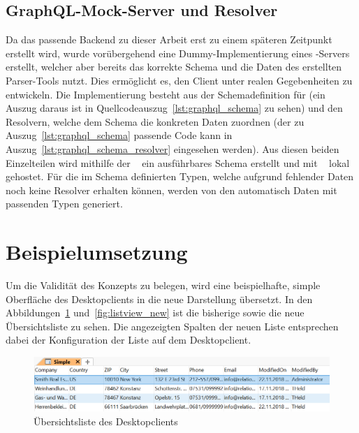 \subsection{GraphQL-Mock-Server und Resolver}
Da das passende Backend zu dieser Arbeit erst zu einem späteren Zeitpunkt erstellt wird, wurde vorübergehend eine Dummy-Implementierung eines -Servers erstellt, welcher aber bereits das korrekte Schema und die Daten des erstellten Parser-Tools nutzt. Dies ermöglicht es, den Client unter realen Gegebenheiten zu entwickeln. Die Implementierung besteht aus der Schemadefinition für  (ein Auszug daraus ist in Quellcodeauszug~\ref{lst:graphql_schema} zu sehen) und den Resolvern, welche dem Schema die konkreten Daten zuordnen (der zu Auszug~\ref{lst:graphql_schema} passende Code kann in Auszug~\ref{lst:graphql_schema_resolver} eingesehen werden). Aus diesen beiden Einzelteilen wird mithilfe der ~\parencite*{apollo_graphql-tools_2019} ein ausführbares Schema erstellt und mit ~\parencite{express_graphql_2018} lokal gehostet. Für die im Schema definierten Typen, welche aufgrund fehlender Daten noch keine Resolver erhalten können, werden von den  automatisch Daten mit passenden Typen generiert.





\section{Beispielumsetzung}
Um die Validität des Konzepts zu belegen, wird eine beispielhafte, simple Oberfläche des  Desktopclients in die neue Darstellung übersetzt. In den Abbildungen~\ref{fig:listview_crm} und~\ref{fig:listview_new} ist die bisherige sowie die neue Übersichtsliste zu sehen. Die angezeigten Spalten der neuen Liste entsprechen dabei der Konfiguration der Liste auf dem Desktopclient. 

\begin{figure}
    \centering
    \captionsetup{justification=centering}
    \includegraphics[width=\textwidth]{figures/listview_crm.png}
        \caption{Übersichtsliste des Desktopclients}\label{fig:listview_crm}
\end{figure}

